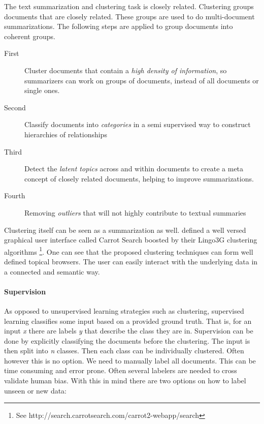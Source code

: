   The text summarization and clustering task is closely related. Clustering groups documents that are closely related. These groups are used to do multi-document summarizations. The following steps are applied to group documents into coherent groups. \cite{NewsBlaster2002}
  
  \begin{description}
    \item[First] Cluster documents that contain a \emph{high density of information}, so summarizers can work on groups of documents, instead of all documents or single ones.
    \item[Second] Classify documents into \emph{categories} in a semi supervised way to construct hierarchies of relationships
    \item[Third] Detect the \emph{latent topics} across and within documents to create a meta concept of closely related documents, helping to improve summarizations.
    \item[Fourth] Removing \emph{outliers} that will not highly contribute to textual summaries
  \end{description}

  Clustering itself can be seen as a summarization as well. \cite{Carrot2Search2003} defined a well versed graphical user interface called Carrot Search boosted by their Lingo3G clustering algorithms \footnote{See http://search.carrotsearch.com/carrot2-webapp/search}. One can see that the proposed clustering techniques can form well defined topical browsers. The user can easily interact with the underlying data in a connected and semantic way.

  \paragraph{Supervision}
    As opposed to unsupervised learning strategies such as clustering, supervised learning classifies some input based on a provided ground truth. That is, for an input \emph{x} there are labels \emph{y} that describe the class they are in. Supervision can be done by explicitly classifying the documents before the clustering. The input is then split into \emph{n} classes. Then each class can be individually clustered. Often however this is no option. We need to manually label all documents. This can be time consuming and error prone. Often several labelers are needed to cross validate human bias.
    With this in mind there are two options on how to label unseen or new data:

